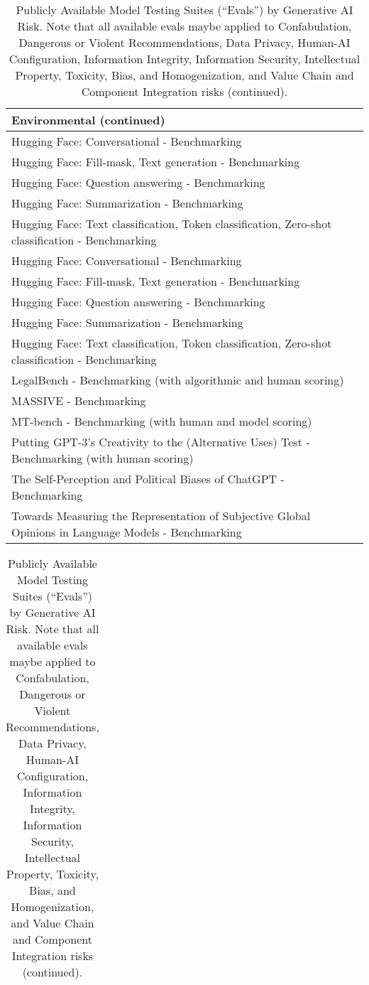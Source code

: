 \documentclass[fleqn]{article}
\begin{document}
\begin{table}[H]
	\caption*{Publicly Available Model Testing Suites (``Evals'') by Generative AI Risk. Note that all available evals maybe applied to Confabulation, Dangerous or Violent Recommendations, Data Privacy, Human-AI Configuration, Information Integrity, Information Security, Intellectual Property, Toxicity, Bias, and Homogenization, and Value Chain and Component Integration risks (continued).}
	\label{tab:low_risk_measure_by_gai_risk_cont3}
	\footnotesize
	\begin{tabular}{l}
		\toprule
		Environmental (continued)\\
		\midrule
		Hugging Face: Conversational - Benchmarking \\
		Hugging Face: Fill-mask, Text generation - Benchmarking \\
		Hugging Face: Question answering - Benchmarking \\
		Hugging Face: Summarization - Benchmarking \\
		Hugging Face: Text classification, Token classification, Zero-shot classification - Benchmarking \\
		Hugging Face: Conversational - Benchmarking \\
		Hugging Face: Fill-mask, Text generation - Benchmarking \\
		Hugging Face: Question answering - Benchmarking \\
		Hugging Face: Summarization - Benchmarking \\
		Hugging Face: Text classification, Token classification, Zero-shot classification - Benchmarking \\
		LegalBench - Benchmarking (with algorithmic and human scoring) \\
		MASSIVE - Benchmarking \\
		MT-bench - Benchmarking (with human and model scoring) \\
		Putting GPT-3's Creativity to the (Alternative Uses) Test - Benchmarking (with human scoring) \\
		The Self-Perception and Political Biases of ChatGPT - Benchmarking \\
		Towards Measuring the Representation of Subjective Global Opinions in Language Models - Benchmarking \\
		\bottomrule
	\end{tabular}
	\newline
	\vspace{10pt}
	\newline
	\begin{tabular}{l}

\end{tabular}
\end{table}
\end{document}
